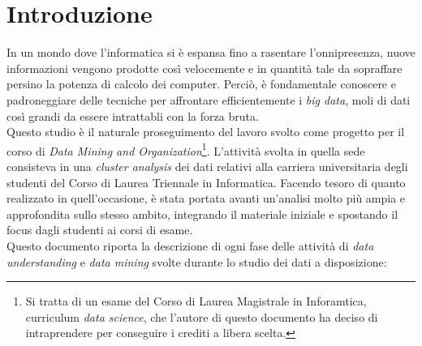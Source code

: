 \chapter{Introduzione}
\label{ch:intro}

In un mondo dove l'informatica si è espansa fino a rasentare l'onnipresenza, nuove informazioni vengono prodotte così velocemente e in quantità tale da sopraffare persino la potenza di calcolo dei computer. Perciò, è fondamentale conoscere e padroneggiare delle tecniche per affrontare efficientemente i \textit{big data}, moli di dati così grandi da essere intrattabli con la forza bruta. \\

Questo studio è il naturale proseguimento del lavoro svolto come progetto per il corso di \textit{Data Mining and Organization}\footnote{Si tratta di un esame del Corso di Laurea Magistrale in Inforamtica, curriculum \textit{data science}, che l'autore di questo documento ha deciso di intraprendere per conseguire i crediti a libera scelta.}. L'attività svolta in quella sede consisteva in una \textit{cluster analysis} dei dati relativi alla carriera universitaria degli studenti del Corso di Laurea Triennale in Informatica. Facendo tesoro di quanto realizzato in quell'occasione, è stata portata avanti un'analisi molto più ampia e approfondita sullo stesso ambito, integrando il materiale iniziale e spostando il focus dagli studenti ai corsi di esame. \\

Questo documento riporta la descrizione di ogni fase delle attività di \textit{data understanding} e \textit{data mining} svolte durante lo studio dei dati a disposizione:

